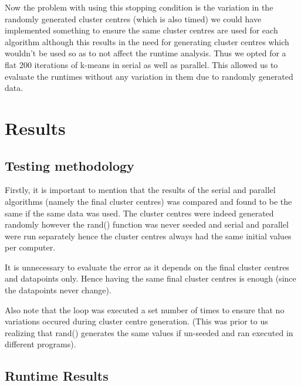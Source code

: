\documentclass{article}
\begin{document}
Now the problem with using this stopping condition is the variation in the randomly generated cluster centres (which is also timed) we could have implemented something to ensure the same cluster centres are used for each algorithm although this results in the need for generating cluster centres which wouldn't be used so as to not affect the runtime analysis. Thus we opted for a flat 200 iterations of k-means in serial as well as parallel. This allowed us to evaluate the runtimes without any variation in them due to randomly generated data.

\newpage
\section{Results}
\subsection{Testing methodology}
Firstly, it is important to mention that the results of the serial and parallel algorithms (namely the final cluster centres) was compared and found to be the same if the same data was used. The cluster centres were indeed generated randomly however the rand() function was never seeded and serial and parallel were run separately hence the cluster centres always had the same initial values per computer.

It is unnecessary to evaluate the error as it depends on the final cluster centres and datapoints only. Hence having the same final cluster centres is enough (since the datapoints never change).

Also note that the loop was executed a set number of times to ensure that no variations occured during cluster centre generation. (This was prior to us realizing that rand() generates the same values if un-seeded and ran executed in different programs).

\newpage
\subsection{Runtime Results}
\end{document}
